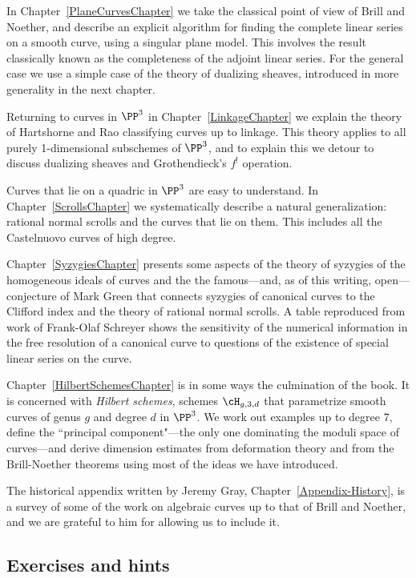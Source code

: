 In Chapter~\ref{PlaneCurvesChapter} we take the classical point of view of Brill and Noether,
and describe an explicit algorithm for finding the complete linear series on a smooth curve, using a singular plane model. This involves the result classically known as the completeness of the adjoint linear series. For the general case we use a simple case of the theory of dualizing sheaves, introduced in more generality in the next chapter.

Returning to curves in $\PP^{3}$ in Chapter~\ref{LinkageChapter} we explain the theory of Hartshorne and Rao classifying curves up to linkage. This theory applies to all purely 1-dimensional subschemes of $\PP^{3}$, and to explain this
we detour to discuss dualizing sheaves and Grothendieck's $f^{!}$ operation.

Curves that lie on a quadric in $\PP^3$ are easy to understand. In Chapter~\ref{ScrollsChapter} we systematically describe a natural generalization: rational normal scrolls and the curves that lie on them. This includes all the Castelnuovo curves of high degree. 

Chapter~\ref{SyzygiesChapter} presents some aspects of the theory of syzygies of the homogeneous ideals of curves and the the famous---and, as of this writing, open---conjecture of Mark Green that connects syzygies of canonical curves to the Clifford index and the theory of rational normal scrolls. A table reproduced from work of Frank-Olaf Schreyer shows the sensitivity of the numerical information in the free resolution of a canonical curve to questions of the existence of special linear series on the curve.

Chapter~\ref{HilbertSchemesChapter} is in some ways the culmination of the book. It is concerned with \emph{Hilbert schemes}, schemes $\cH_{g,3,d}$ that parametrize smooth curves of genus $g$ and degree $d$  in $\PP^3$. We work out examples up to degree 7, define the ``principal component"---the only one dominating the moduli space of curves---and derive dimension estimates from deformation theory and from the Brill-Noether theorems
using most of the ideas we have introduced. 

The historical appendix written by Jeremy Gray, Chapter~\ref{Appendix-History},  is a survey of some of the work on
algebraic curves up to that of Brill and Noether, and we are grateful to him for allowing us to include it.

\subsection{Exercises and hints}

